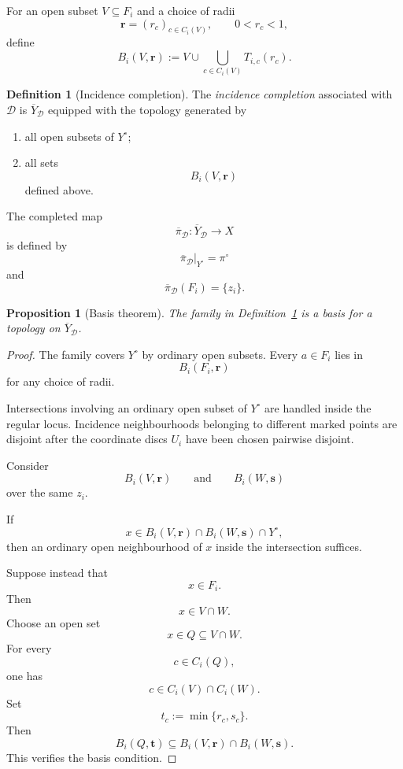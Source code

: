\documentclass[11pt]{article}
\theoremstyle{plain}
\newtheorem{proposition}[theorem]{Proposition}
\theoremstyle{definition}
\newtheorem{definition}[theorem]{Definition}
\begin{document}
For an open subset $V\subseteq F_i$ and a choice of radii
\[
\mathbf r=(r_c)_{c\in C_i(V)},
\qquad
0<r_c<1,
\]
define
\[
B_i(V,\mathbf r)
:=
V
\cup
\bigcup_{c\in C_i(V)}
T_{i,c}(r_c).
\]

\begin{definition}[Incidence completion]
\label{def:incidence-completion}
The \emph{incidence completion} associated with $\mathcal D$ is
$\overline Y_{\mathcal D}$ equipped with the topology generated by
\begin{enumerate}[label=(\roman*)]
\item all open subsets of $Y^\circ$;
\item all sets
\[
B_i(V,\mathbf r)
\]
defined above.
\end{enumerate}
The completed map
\[
\overline\pi_{\mathcal D}:
\overline Y_{\mathcal D}
\longrightarrow X
\]
is defined by
\[
\overline\pi_{\mathcal D}|_{Y^\circ}
=
\pi^\circ
\]
and
\[
\overline\pi_{\mathcal D}(F_i)=\{z_i\}.
\]
\end{definition}


\begin{proposition}[Basis theorem]
\label{prop:incidence-basis}
The family in Definition~\ref{def:incidence-completion} is a basis for a
topology on $\overline Y_{\mathcal D}$.
\end{proposition}

\begin{proof}
The family covers $Y^\circ$ by ordinary open subsets.  Every
$a\in F_i$ lies in
\[
B_i(F_i,\mathbf r)
\]
for any choice of radii.

Intersections involving an ordinary open subset of $Y^\circ$ are handled
inside the regular locus.  Incidence neighbourhoods belonging to
different marked points are disjoint after the coordinate discs
$U_i$ have been chosen pairwise disjoint.

Consider
\[
B_i(V,\mathbf r)
\qquad\text{and}\qquad
B_i(W,\mathbf s)
\]
over the same $z_i$.

If
\[
x\in
B_i(V,\mathbf r)\cap B_i(W,\mathbf s)
\cap Y^\circ,
\]
then an ordinary open neighbourhood of $x$ inside the intersection
suffices.

Suppose instead that
\[
x\in F_i.
\]
Then
\[
x\in V\cap W.
\]
Choose an open set
\[
x\in Q\subseteq V\cap W.
\]
For every
\[
c\in C_i(Q),
\]
one has
\[
c\in C_i(V)\cap C_i(W).
\]
Set
\[
t_c:=\min\{r_c,s_c\}.
\]
Then
\[
B_i(Q,\mathbf t)
\subseteq
B_i(V,\mathbf r)\cap B_i(W,\mathbf s).
\]
This verifies the basis condition.
\end{proof}
\end{document}
